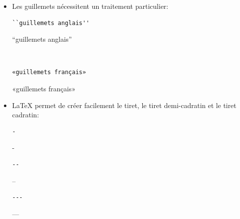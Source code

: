 \begin{itemize}
\begin{demo}
\begin{minipage}{0.3\linewidth}
\begin{texample}
        \producing\}
      \end{texample}
    \end{minipage}
    \hfill
    \begin{minipage}{0.3\linewidth}
      \begin{texample}
\begin{lstlisting}
\}
\end{lstlisting}
        \producing\}
      \end{texample}
    \end{minipage}
  \end{demo}
%
\item Les guillemets nécessitent un traitement particulier:
  \begin{demo}
    \begin{texample}
\begin{lstlisting}[escapeinside={}]
``guillemets anglais''
\end{lstlisting}
      \producing
      ``guillemets anglais''
    \end{texample} \\
    \begin{texample}
\begin{lstlisting}
«guillemets français»
\end{lstlisting}
      \producing
      «guillemets français»
    \end{texample}
  \end{demo}
%
\item {\LaTeX} permet de créer facilement le tiret, le tiret
  demi-cadratin et le tiret cadratin:
  \begin{demo}
    \begin{minipage}{0.3\linewidth}
      \begin{texample}
\begin{lstlisting}
-
\end{lstlisting}
        \producing
        -
      \end{texample}
    \end{minipage}
    \hfill
    \begin{minipage}{0.3\linewidth}
      \begin{texample}
\begin{lstlisting}
--
\end{lstlisting}
        \producing
        --
      \end{texample}
    \end{minipage}
    \hfill
    \begin{minipage}{0.3\linewidth}
      \begin{texample}
\begin{lstlisting}
---
\end{lstlisting}
        \producing
        ---
      \end{texample}
    \end{minipage}
  \end{demo}
\end{itemize}


